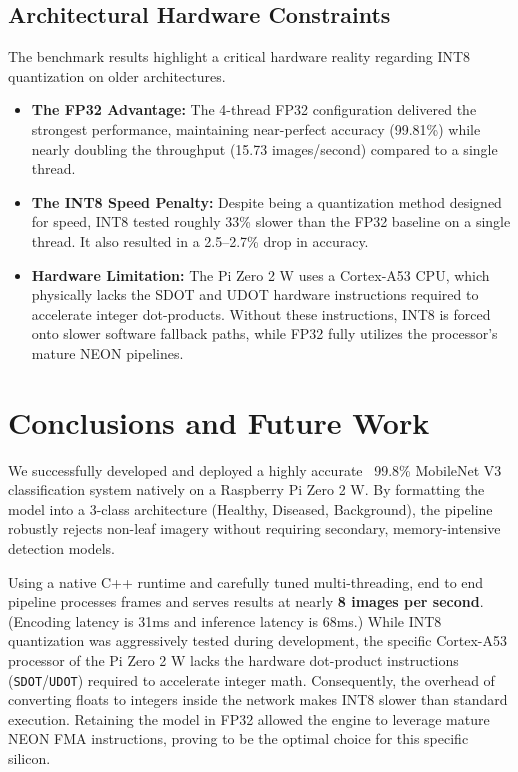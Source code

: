 \documentclass[a4paper,onesided,12pt]{report}
\begin{document}
\section{Architectural Hardware Constraints}

The benchmark results highlight a critical hardware reality regarding INT8 quantization on older architectures.

\begin{itemize}
    \item \textbf{The FP32 Advantage:} The 4-thread FP32 configuration delivered the strongest performance, maintaining near-perfect accuracy (99.81\%) while nearly doubling the throughput (15.73 images/second) compared to a single thread.
    \item \textbf{The INT8 Speed Penalty:} Despite being a quantization method designed for speed, INT8 tested roughly 33\% slower than the FP32 baseline on a single thread. It also resulted in a 2.5--2.7\% drop in accuracy.
    \item \textbf{Hardware Limitation:} The Pi Zero 2 W uses a Cortex-A53 CPU, which physically lacks the SDOT and UDOT hardware instructions required to accelerate integer dot-products. Without these instructions, INT8 is forced onto slower software fallback paths, while FP32 fully utilizes the processor's mature NEON pipelines.
\end{itemize}

\chapter{Conclusions and Future Work}

We successfully developed and deployed a highly accurate ~99.8\% MobileNet V3 classification system natively on a Raspberry Pi Zero 2 W. By formatting the model into a 3-class architecture (Healthy, Diseased, Background), the pipeline robustly rejects non-leaf imagery without requiring secondary, memory-intensive detection models.

Using a native C++ runtime and carefully tuned multi-threading, end to end pipeline processes frames and serves results at nearly \textbf{8 images per second}. (Encoding latency is 31ms and inference latency is 68ms.) While INT8 quantization was aggressively tested during development, the specific Cortex-A53 processor of the Pi Zero 2 W lacks the hardware dot-product instructions (\texttt{SDOT}/\texttt{UDOT}) required to accelerate integer math. Consequently, the overhead of converting floats to integers inside the network makes INT8 slower than standard execution. Retaining the model in FP32 allowed the engine to leverage mature NEON FMA instructions, proving to be the optimal choice for this specific silicon.
\end{document}
